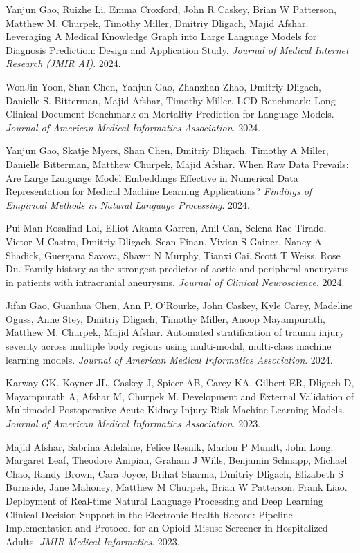\documentclass[letterpaper]{article}
\renewenvironment{itemize}{
  \begin{list}{}{
    \setlength{\leftmargin}{1.5em}
  }
}{
  \end{list}
}
\begin{document}
\begin{itemize}
\item Yanjun Gao, Ruizhe Li, Emma Croxford, John R Caskey, Brian W Patterson, Matthew M. Churpek, Timothy Miller, Dmitriy Dligach, Majid Afshar. Leveraging A Medical Knowledge Graph into Large Language Models for Diagnosis Prediction: Design and Application Study. \emph{Journal of Medical Internet Research (JMIR AI)}. 2024.
\item WonJin Yoon, Shan Chen, Yanjun Gao, Zhanzhan Zhao, Dmitriy Dligach, Danielle S. Bitterman, Majid Afshar, Timothy Miller. LCD Benchmark: Long Clinical Document Benchmark on Mortality Prediction for Language Models. \emph{Journal of American Medical Informatics Association}. 2024.
\item Yanjun Gao, Skatje Myers, Shan Chen, Dmitriy Dligach, Timothy A Miller, Danielle Bitterman, Matthew Churpek, Majid Afshar. When Raw Data Prevails: Are Large Language Model Embeddings Effective in Numerical Data Representation for Medical Machine Learning Applications? \emph{Findings of Empirical Methods in Natural Language Processing}. 2024.
\item Pui Man Rosalind Lai, Elliot Akama-Garren, Anil Can, Selena-Rae Tirado, Victor M Castro, Dmitriy Dligach, Sean Finan, Vivian S Gainer, Nancy A Shadick, Guergana Savova, Shawn N Murphy, Tianxi Cai, Scott T Weiss, Rose Du. Family history as the strongest predictor of aortic and peripheral aneurysms in patients with intracranial aneurysms. \emph{Journal of Clinical Neuroscience}. 2024.
\item Jifan Gao, Guanhua Chen, Ann P. O’Rourke, John Caskey, Kyle Carey, Madeline Oguss, Anne Stey, Dmitriy Dligach, Timothy Miller, Anoop Mayampurath, Matthew M. Churpek, Majid Afshar. Automated stratification of trauma injury severity across multiple body regions using multi-modal, multi-class machine learning models. \emph{Journal of American Medical Informatics Association}. 2024.
\item Karway GK. Koyner JL, Caskey J, Spicer AB, Carey KA, Gilbert ER, Dligach D, Mayampurath A, Afshar M, Churpek M. Development and External Validation of Multimodal Postoperative Acute Kidney Injury Risk Machine Learning Models. \emph{Journal of American Medical Informatics Association}. 2023.
\item Majid Afshar, Sabrina Adelaine, Felice Resnik, Marlon P Mundt, John Long, Margaret Leaf, Theodore Ampian, Graham J Wills, Benjamin Schnapp, Michael Chao, Randy Brown, Cara Joyce, Brihat Sharma, Dmitriy Dligach, Elizabeth S Burnside, Jane Mahoney, Matthew M Churpek, Brian W Patterson, Frank Liao. Deployment of Real-time Natural Language Processing and Deep Learning Clinical Decision Support in the Electronic Health Record: Pipeline Implementation and Protocol for an Opioid Misuse Screener in Hospitalized Adults. \emph{JMIR Medical Informatics}. 2023.

\end{itemize}
\end{document}
